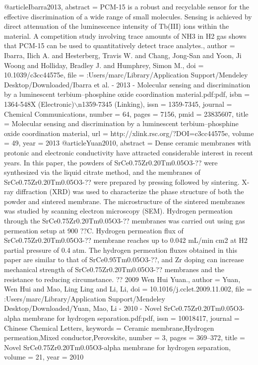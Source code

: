 @article{Ibarra2013,
abstract = {PCM-15 is a robust and recyclable sensor for the effective discrimination of a wide range of small molecules. Sensing is achieved by direct attenuation of the luminescence intensity of Tb(III) ions within the material. A competition study involving trace amounts of NH3 in H2 gas shows that PCM-15 can be used to quantitatively detect trace analytes.},
author = {Ibarra, Ilich A. and Hesterberg, Travis W. and Chang, Jong-San and Yoon, Ji Woong and Holliday, Bradley J. and Humphrey, Simon M.},
doi = {10.1039/c3cc44575e},
file = {:Users/marc/Library/Application Support/Mendeley Desktop/Downloaded/Ibarra et al. - 2013 - Molecular sensing and discrimination by a luminescent terbium–phosphine oxide coordination material.pdf:pdf},
isbn = {1364-548X (Electronic)$\backslash$n1359-7345 (Linking)},
issn = {1359-7345},
journal = {Chemical Communications},
number = {64},
pages = {7156},
pmid = {23835607},
title = {{Molecular sensing and discrimination by a luminescent terbium–phosphine oxide coordination material}},
url = {http://xlink.rsc.org/?DOI=c3cc44575e},
volume = {49},
year = {2013}
}
@article{Yuan2010,
abstract = {Dense ceramic membranes with protonic and electronic conductivity have attracted considerable interest in recent years. In this paper, the powders of SrCe0.75Zr0.20Tm0.05O3-?? were synthesized via the liquid citrate method, and the membranes of SrCe0.75Zr0.20Tm0.05O3-?? were prepared by pressing followed by sintering. X-ray diffraction (XRD) was used to characterize the phase structure of both the powder and sintered membrane. The microstructure of the sintered membranes was studied by scanning electron microscopy (SEM). Hydrogen permeation through the SrCe0.75Zr0.20Tm0.05O3-?? membranes was carried out using gas permeation setup at 900 ??C. Hydrogen permeation flux of SrCe0.75Zr0.20Tm0.05O3-?? membrane reaches up to 0.042 mL/min cm2 at H2 partial pressure of 0.4 atm. The hydrogen permeation fluxes obtained in this paper are similar to that of SrCe0.95Tm0.05O3-??, and Zr doping can increase mechanical strength of SrCe0.75Zr0.20Tm0.05O3-?? membranes and the resistance to reducing circumstance. ?? 2009 Wen Hui Yuan.},
author = {Yuan, Wen Hui and Mao, Ling Ling and Li, Li},
doi = {10.1016/j.cclet.2009.11.002},
file = {:Users/marc/Library/Application Support/Mendeley Desktop/Downloaded/Yuan, Mao, Li - 2010 - Novel SrCe0.75Zr0.20Tm0.05O3-alpha membrane for hydrogen separation.pdf:pdf},
issn = {10018417},
journal = {Chinese Chemical Letters},
keywords = {Ceramic membrane,Hydrogen permeation,Mixed conductor,Perovskite},
number = {3},
pages = {369--372},
title = {{Novel SrCe0.75Zr0.20Tm0.05O3-alpha membrane for hydrogen separation}},
volume = {21},
year = {2010}
}
